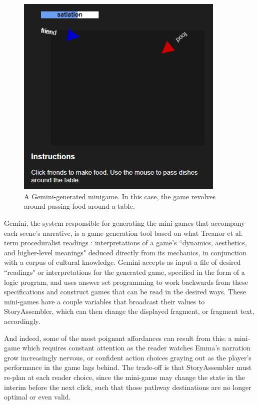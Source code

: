 
\begin{figure}
    \centering
    \includegraphics[width=10cm]{figures/3-StoryAssembler/game.png}
    \caption{A Gemini-generated minigame. In this case, the game revolves around passing food around a table.}
    \label{fig:gemini-game}
\end{figure}


Gemini, the system responsible for generating the mini-games that accompany each scene's narrative, is a game generation tool based on what Treanor et al. term proceduralist readings \cite{treanorProceduralistReadings}: interpretations of a game’s ``dynamics, aesthetics, and higher-level meanings" deduced directly from its mechanics, in conjunction with a corpus of cultural knowledge. Gemini accepts as input a file of desired ``readings" or interpretations for the generated game, specified in the form of a logic program, and uses answer set programming to work backwards from these specifications and construct games that can be read in the desired ways. These mini-games have a couple variables that broadcast their values to StoryAssembler, which can then change the displayed fragment, or fragment text, accordingly.

And indeed, some of the most poignant affordances can result from this: a mini-game which requires constant attention as the reader watches Emma’s narration grow increasingly nervous, or confident action choices graying out as the player’s performance in the game lags behind. The trade-off is that StoryAssembler must re-plan at each reader choice, since the mini-game may change the state in the interim before the next click, such that those pathway destinations are no longer optimal or even valid. 

